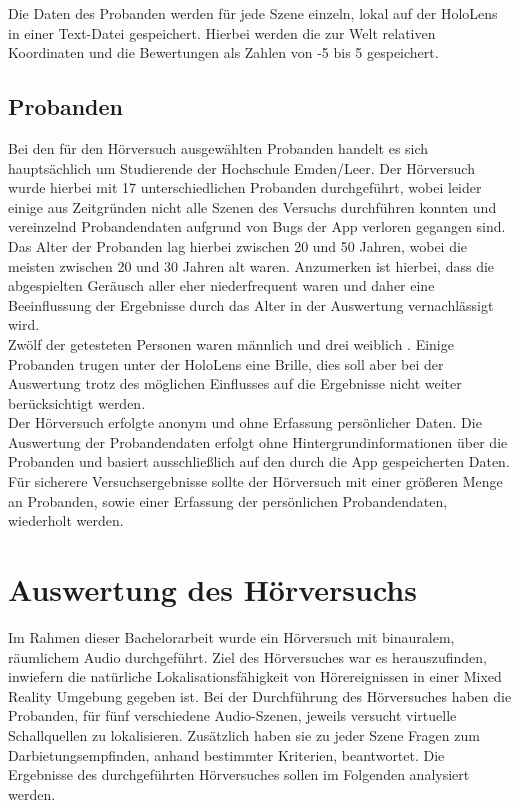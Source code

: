  Die Daten des Probanden werden für jede Szene  einzeln, lokal auf der HoloLens in einer Text-Datei gespeichert. Hierbei werden die zur Welt relativen Koordinaten und die Bewertungen als Zahlen von -5 bis 5 gespeichert. 
 
 
 \section{Probanden}
 
 Bei den für den Hörversuch ausgewählten Probanden handelt es sich hauptsächlich um Studierende der Hochschule Emden/Leer. Der Hörversuch wurde hierbei mit 17 unterschiedlichen Probanden durchgeführt, wobei leider einige aus Zeitgründen nicht alle Szenen des Versuchs durchführen konnten und vereinzelnd Probandendaten aufgrund von Bugs der App verloren gegangen sind. \\
 
  Das Alter der Probanden lag hierbei zwischen 20 und 50 Jahren, wobei die meisten zwischen 20 und 30 Jahren alt waren. Anzumerken ist hierbei, dass die abgespielten Geräusch aller eher niederfrequent waren und daher eine Beeinflussung der Ergebnisse durch das Alter in der Auswertung vernachlässigt wird. \\ 
  
 Zwölf der getesteten Personen waren männlich und drei  weiblich . Einige Probanden trugen unter der HoloLens eine Brille, dies soll aber bei der Auswertung trotz des möglichen Einflusses auf die Ergebnisse nicht weiter berücksichtigt werden. \\ 
 
 Der Hörversuch erfolgte anonym und ohne Erfassung persönlicher Daten. Die Auswertung der Probandendaten erfolgt ohne Hintergrundinformationen über die Probanden und basiert ausschließlich auf den durch die App gespeicherten Daten. Für sicherere Versuchsergebnisse sollte der Hörversuch mit einer größeren Menge an Probanden, sowie einer Erfassung der persönlichen Probandendaten, wiederholt werden.
 
 \chapter{Auswertung des Hörversuchs}
 Im Rahmen dieser Bachelorarbeit wurde ein Hörversuch mit binauralem, räumlichem Audio durchgeführt. Ziel des Hörversuches war es herauszufinden, inwiefern die natürliche Lokalisationsfähigkeit von Hörereignissen in einer Mixed Reality Umgebung gegeben ist. Bei der Durchführung des Hörversuches haben die Probanden, für fünf verschiedene Audio-Szenen, jeweils versucht virtuelle Schallquellen zu lokalisieren.  Zusätzlich haben sie zu jeder Szene Fragen zum Darbietungsempfinden, anhand bestimmter Kriterien, beantwortet.  Die Ergebnisse des durchgeführten Hörversuches sollen im Folgenden analysiert werden.
 

